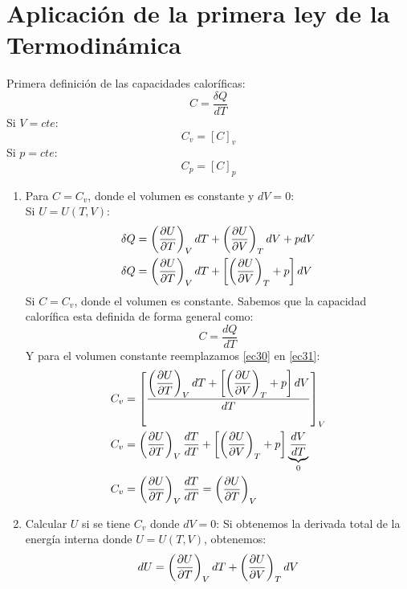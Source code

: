 \documentclass[../main]{subfiles}
\begin{document}
\section{Aplicación de la primera ley de la Termodinámica}
Primera definición de las capacidades caloríficas: \\
    \begin{equation}
        C=\dfrac{\delta Q}{dT}
    \end{equation}
    Si $V=cte$:
    \begin{equation}
        C_v=[C]_v
    \end{equation}
    Si $p=cte$:
    \begin{equation}
        C_p=[C]_p
    \end{equation}
\begin{enumerate}
    \item Para $C=C_v$, donde el volumen es constante y $dV=0$: \\
    Si $U=U(T,V)$:
    \begin{align}
        \delta Q&=\left(\pdv{U}{T}\right)_V dT+\left( \pdv{U}{V}\right)_T dV+pdV \\
        \delta Q&=\left(\pdv{U}{T}\right)_V dT+\left[\left( \pdv{U}{V}\right)_T+p\right]dV
        \label{ec30}
    \end{align}
    Si $C=C_v$, donde el volumen es constante. Sabemos que la capacidad calorífica esta definida de forma general como:
    \begin{equation}
        C=\dfrac{dQ}{dT}
        \label{ec31}
    \end{equation}
    Y para el volumen constante reemplazamos \eqref{ec30} en \eqref{ec31}:
    \begin{align}
        C_v&=\left[\dfrac{\displaystyle \left(\pdv{U}{T}\right)_V dT+\left[\left( \pdv{U}{V}\right)_T+p\right]dV}{dT}\right]_V \\
        C_v&= \left(\pdv{U}{T}\right)_V \dfrac{dT}{dT}+\left[ \left(\pdv{U}{V}\right)_T+p\right]\underbrace{\dfrac{dV}{dT}}_{0} \\
        C_v&=\left(\pdv{U}{T}\right)_V \dfrac{dT}{dT}=\left(\pdv{U}{T}\right)_V
    \end{align}
    \item Calcular $U$ si se tiene $C_v$ donde $dV=0$:
    Si obtenemos la derivada total de la energía interna donde $U=U(T,V)$, obtenemos:
    \begin{equation}
        dU=\left( \pdv{U}{T} \right)_V dT+\left( \pdv{U}{V} \right)_T dV
    \end{equation}

\end{enumerate}
\end{document}
